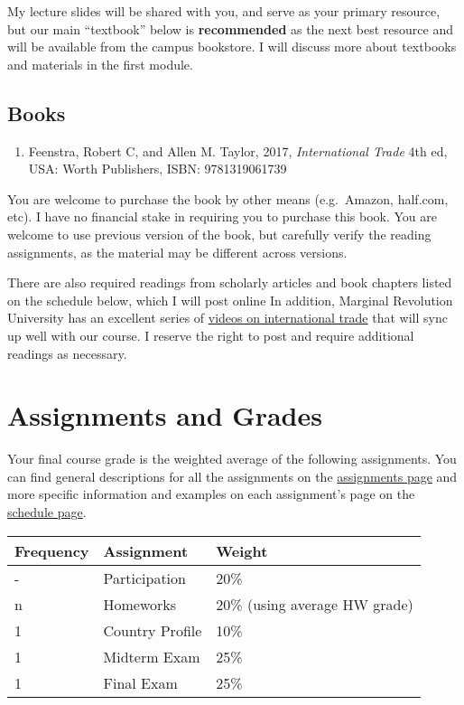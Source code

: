 \documentclass{article}
\providecommand{\tightlist}{%
  \setlength{\itemsep}{0pt}\setlength{\parskip}{0pt}}
\begin{document}
My lecture slides will be shared with you, and serve as your primary
resource, but our main ``textbook'' below is \textbf{recommended} as the
next best resource and will be available from the campus bookstore. I
will discuss more about textbooks and materials in the first module.

\hypertarget{books}{%
\subsection*{Books}\label{books}}

\begin{enumerate}
\def\labelenumi{\arabic{enumi}.}
\tightlist
\item
  Feenstra, Robert C, and Allen M. Taylor, 2017, \emph{International
  Trade} 4th ed, USA: Worth Publishers, ISBN: 9781319061739
\end{enumerate}

You are welcome to purchase the book by other means (e.g.~Amazon,
half.com, etc). I have no financial stake in requiring you to purchase
this book. You are welcome to use previous version of the book, but
carefully verify the reading assignments, as the material may be
different across versions.

There are also required readings from scholarly articles and book
chapters listed on the schedule below, which I will post online In
addition, Marginal Revolution University has an excellent series of
\href{http://mruniversity.com/courses/international-trade}{videos on
international trade} that will sync up well with our course. I reserve
the right to post and require additional readings as necessary.

\hypertarget{assignments-and-grades}{%
\section*{Assignments and Grades}\label{assignments-and-grades}}

Your final course grade is the weighted average of the following
assignments. You can find general descriptions for all the assignments
on the
\href{http://tradeF20.classes.ryansafner.com/assignments/}{assignments
page} and more specific information and examples on each assignment's
page on the
\href{http://tradeF20.classes.ryansafner.com/schedule/}{schedule page}.

\begin{center}

\begin{tabular}{lll}
\toprule
Frequency & Assignment & Weight\\
\midrule
- & Participation & 20\%\\
n & Homeworks & 20\% (using average HW grade)\\
1 & Country Profile & 10\%\\
1 & Midterm Exam & 25\%\\
1 & Final Exam & 25\%\\
\bottomrule
\end{tabular}
\end{center}
\end{document}
